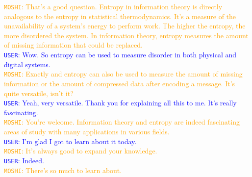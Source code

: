 \begin{tcolorbox}
\textcolor{orange}{\texttt{MOSHI}: That's a good question. Entropy in information theory is directly analogous to the entropy in statistical thermodynamics. It's a measure of the unavailability of a system's energy to perform work. The higher the entropy, the more disordered the system. In information theory, entropy measures the amount of missing information that could be replaced.} \\
\textcolor{blue}{\texttt{USER}: Wow. So entropy can be used to measure disorder in both physical and digital systems.} \\
\textcolor{orange}{\texttt{MOSHI}: Exactly and entropy can also be used to measure the amount of missing information or the amount of compressed data after encoding a message. It's quite versatile, isn't it?} \\
\textcolor{blue}{\texttt{USER}: Yeah, very versatile. Thank you for explaining all this to me. It's really fascinating.} \\
\textcolor{orange}{\texttt{MOSHI}: You're welcome. Information theory and entropy are indeed fascinating areas of study with many applications in various fields.} \\
\textcolor{blue}{\texttt{USER}: I'm glad I got to learn about it today.} \\
\textcolor{orange}{\texttt{MOSHI}: It's always good to expand your knowledge.} \\
\textcolor{blue}{\texttt{USER}: Indeed.} \\
\textcolor{orange}{\texttt{MOSHI}: There's so much to learn about.} 
\end{tcolorbox}

